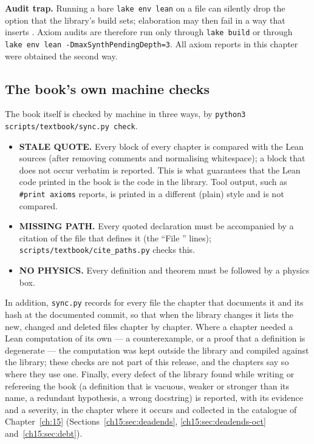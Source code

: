 \begin{warning}
\textbf{Audit trap.} Running a bare \texttt{lake env lean} on a file can silently drop the option
 that the library's build sets; elaboration may then fail in a way that
inserts . Axiom audits are therefore run only through \texttt{lake build} or through
\texttt{lake env lean -DmaxSynthPendingDepth=3}. All axiom reports in this chapter were obtained the
second way.
\end{warning}

\subsection{The book's own machine checks}\label{ch01:sec:bookchecks}

The book itself is checked by machine in three ways, by \texttt{python3 scripts/textbook/sync.py
check}.
\begin{itemize}
\item \textbf{STALE QUOTE.} Every  block of every chapter is compared with the Lean
  sources (after removing comments and normalising whitespace); a block that does not occur
  verbatim is reported. This is what guarantees that the Lean code printed in the book is the code
  in the library. Tool output, such as \texttt{\#print axioms} reports, is printed in a different
  (plain) style and is not compared.
\item \textbf{MISSING PATH.} Every quoted declaration must be accompanied by a citation of the file
  that defines it (the ``File '' lines); \texttt{scripts/textbook/cite\_paths.py}
  checks this.
\item \textbf{NO PHYSICS.} Every definition and theorem must be followed by a physics box.
\end{itemize}
In addition, \texttt{sync.py} records for every  file the chapter that documents it and
its hash at the documented commit, so that when the library changes it lists the new, changed and
deleted files chapter by chapter. Where a chapter needed a Lean computation of its own --- a
counterexample, or a proof that a definition is degenerate --- the computation was kept outside the
library and compiled against the library; these checks are not part of this release, and the
chapters say so where they use one. Finally, every defect of the library
found while writing or refereeing the book (a definition that is vacuous, weaker or stronger than its
name, a redundant hypothesis, a wrong docstring) is reported, with its evidence and a severity, in the
chapter where it occurs and collected in the catalogue of Chapter~\ref{ch:15}
(Sections~\ref{ch15:sec:deadends}, \ref{ch15:sec:deadends-oct} and~\ref{ch15:sec:debt}).

